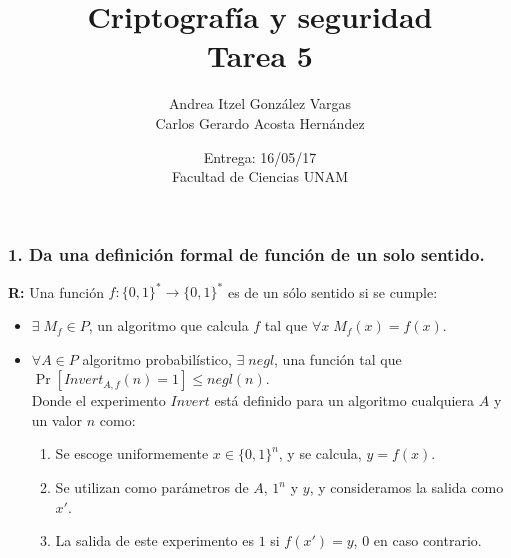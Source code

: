 \documentclass[14pt]{article}
\title{Criptografía y seguridad \\ Tarea 5}
\author{Andrea Itzel González Vargas \\ Carlos Gerardo Acosta Hernández}
\date{Entrega: 16/05/17 \\ Facultad de Ciencias UNAM}
\begin{document}
\maketitle

\subsubsection*{1. Da una definición formal de función de un solo sentido.}
\textbf{R:} Una función $f : \{0,1\}^* \to \{0,1\}^*$ es de un sólo sentido si se cumple:
\begin{itemize}
\item $\exists\; M_f \in P$, un algoritmo que calcula $f$ tal que $\forall x \;M_f(x) = f(x)$. 
\item $\forall A \in P$ algoritmo probabilístico, $\exists \;negl$, una función tal que $\Pr[Invert_{A,f}(n) = 1] \leq negl(n)$.\\
  Donde el experimento $Invert$ está definido para un algoritmo cualquiera $A$ y un valor $n$ como:
  \begin{enumerate}
  \item Se escoge uniformemente $x \in \{0,1\}^n$, y se calcula, $y = f(x)$.
  \item Se utilizan como parámetros de $A$, $1^n$ y $y$, y consideramos la salida como $x'$.
  \item La salida de este experimento es $1$ si $f(x') = y$, $0$ en caso contrario.
  \end{enumerate}
\end{itemize}
\end{document}
